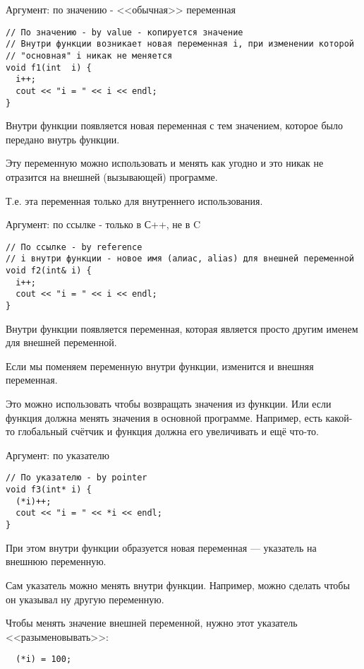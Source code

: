\begin{frame}[t,fragile]{Аргумент: по значению - <<обычная>> переменная}
\begin{lstlisting}
// По значению - by value - копируется значение
// Внутри функции возникает новая переменная i, при изменении которой
// "основная" i никак не меняется
void f1(int  i) { 
  i++;    
  cout << "i = " << i << endl; 
}
\end{lstlisting}

Внутри функции появляется новая переменная с тем значением, которое было передано внутрь функции.

Эту переменную можно использовать и менять как угодно и это никак не отразится на 
внешней (вызывающей) программе.

Т.е. эта переменная только для внутреннего использования.  

\end{frame}

\begin{frame}[t,fragile]{Аргумент: по ссылке - только в С++, не в C}
\begin{lstlisting}
// По ссылке - by reference
// i внутри функции - новое имя (алиас, alias) для внешней переменной
void f2(int& i) { 
  i++;     
  cout << "i = " << i << endl;  
}
\end{lstlisting}

Внутри функции появляется переменная, которая является просто другим именем для
внешней переменной.

Если мы поменяем переменную внутри функции, изменится и внешняя переменная.

Это можно использовать чтобы возвращать значения из функции. 
Или если функция должна менять значения в основной программе.
Например, есть какой-то глобальный счётчик и функция должна его увеличивать и ещё что-то.
\end{frame}

\begin{frame}[t,fragile]{Аргумент: по указателю}
\begin{lstlisting}
// По указателю - by pointer
void f3(int* i) { 
  (*i)++;  
  cout << "i = " << *i << endl; 
}
\end{lstlisting}

При этом внутри функции образуется новая переменная --- указатель на внешнюю переменную.

Сам указатель можно менять внутри функции.
Например, можно сделать чтобы он указывал ну другую переменную.

Чтобы менять значение внешней переменной, нужно этот указатель
<<разыменовывать>>:

\begin{lstlisting}
  (*i) = 100;   
\end{lstlisting}

\end{frame}


